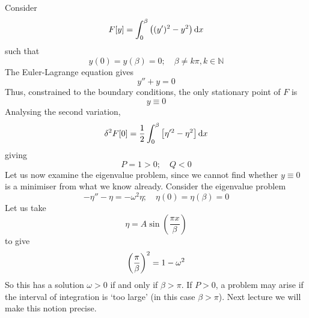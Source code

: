 \begin{example}
	Consider
	\[
		F[y] = \int_0^\beta \qty((y')^2 - y^2)\dd{x}
	\]
	such that
	\[
		y(0) = y(\beta) = 0;\quad \beta \neq k\pi, k \in \mathbb N
	\]
	The Euler-Lagrange equation gives
	\[
		y'' + y = 0
	\]
	Thus, constrained to the boundary conditions, the only stationary point of \( F \) is
	\[
		y \equiv 0
	\]
	Analysing the second variation,
	\[
		\delta^2 F[0] = \frac{1}{2} \int_0^\beta \qty[\eta'^2 - \eta^2] \dd{x}
	\]
	giving
	\[
		P = 1 > 0;\quad Q < 0
	\]
	Let us now examine the eigenvalue problem, since we cannot find whether \( y \equiv 0 \) is a minimiser from what we know already.
	Consider the eigenvalue problem
	\[
		-\eta'' - \eta = -\omega^2 \eta;\quad \eta(0) = \eta(\beta) = 0
	\]
	Let us take
	\[
		\eta = A \sin(\frac{\pi x}{\beta})
	\]
	to give
	\[
		\qty(\frac{\pi}{\beta})^2 = 1 - \omega^2
	\]
	So this has a solution \( \omega > 0 \) if and only if \( \beta > \pi \).
	If \( P > 0 \), a problem may arise if the interval of integration is `too large' (in this case \( \beta > \pi \)).
	Next lecture we will make this notion precise.
\end{example}

